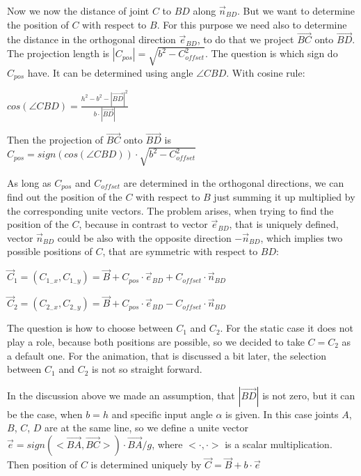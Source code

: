 \documentclass{article}
\begin{document}
\begin{itemize}
 	Now we now the distance of joint $C$ to $BD$ along $\overrightarrow{n}_{BD}$. But we want to determine the position of $C$ with respect to $B$. For this purpose we need also to determine the distance in the orthogonal direction $\overrightarrow{e}_{BD}$, to do that we project $\overrightarrow{BC}$ onto $\overrightarrow{BD}$. The projection length is $|C_{pos}| = \sqrt{b^2 - C_{offset}^2}$. The question is which sign do $C_{pos}$ have. It can be determined using angle $\angle CBD$. With cosine rule: 
 	
 	$cos(\angle CBD) = \frac{h^2 - b^2 - |\overrightarrow{BD}|^2}{b \cdot |\overrightarrow{BD}|}$
 	
 	Then the projection of $\overrightarrow{BC}$ onto $\overrightarrow{BD}$ is $C_{pos} = sign(cos(\angle CBD)) \cdot \sqrt{b^2 - C_{offset}^2}$
 	
 	As long as $C_{pos}$ and $C_{offset}$ are determined in the orthogonal directions, we can find out the position of the $C$ with respect to $B$ just summing it up multiplied by the corresponding unite vectors. The problem arises, when trying to find the position of the $C$, because in contrast to vector $\overrightarrow{e}_{BD}$, that is uniquely defined, vector $\overrightarrow{n}_{BD}$ could be also with the opposite direction $-\overrightarrow{n}_{BD}$, which implies two possible positions of $C$, that are symmetric with respect to $BD$:
 	
 	$\overrightarrow{C}_1 = (C_{1_-x}, C_{1_-y}) = \overrightarrow{B} + C_{pos} \cdot \overrightarrow{e}_{BD} + C_{offset} \cdot \overrightarrow{n}_{BD}$ 
 	
 	$\overrightarrow{C}_2 = (C_{2_-x}, C_{2_-y}) = \overrightarrow{B} + C_{pos} \cdot \overrightarrow{e}_{BD} - C_{offset} \cdot \overrightarrow{n}_{BD}$
 	
 	The question is how to choose between $C_1$ and $C_2$. For the static case it does not play a role, because both positions are possible, so we decided to take $C = C_2$ as a default one. For the animation, that is discussed a bit later, the selection between $C_1$ and $C_2$ is not so straight forward.
 	
 	In the discussion above we made an assumption, that $|\overrightarrow{BD}|$ is not zero, but it can be the case, when $b = h$ and specific input angle $\alpha$ is given. In this case joints $A$, $B$, $C$, $D$ are at the same line, so we define a unite vector $\overrightarrow{e} = sign(<\overrightarrow{BA}, \overrightarrow{BC}>) \cdot \overrightarrow{BA} / g$, where $<\cdot, \cdot>$ is a scalar multiplication. Then position of $C$ is determined uniquely by $\overrightarrow{C} = \overrightarrow{B} + b \cdot \overrightarrow{e}$
 	

\end{itemize}
\end{document}
